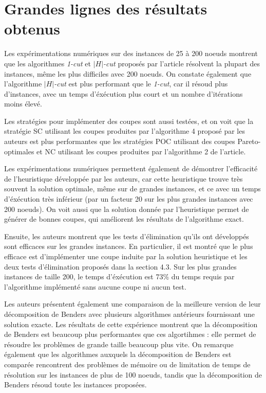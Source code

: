 \section{Grandes lignes des résultats obtenus}

Les expérimentations numériques sur des instances de 25 à 200 noeuds montrent que les algorithmes \emph{1-cut} et \emph{$|H|$-cut} proposés par l'article résolvent la plupart des instances, même les plus difficiles avec 200 noeuds. On constate également que l'algorithme  \emph{$|H|$-cut} est plus performant que le \emph{1-cut}, car il résoud plus d'instances, avec un temps d'éxécution plus court et un nombre d'itérations moins élevé.

Les stratégies pour implémenter des coupes sont aussi testées, et on voit que la stratégie SC utilisant les coupes produites par l'algorithme 4 proposé par les auteurs est plus performantes que les stratégies POC utilisant des coupes Pareto-optimales et NC utilisant les coupes produites par l'algorithme 2 de l'article.

Les expérimentations numériques permettent également de démontrer l'efficacité de l'heuristique développée par les auteurs, car cette heuristique trouve très souvent la solution optimale, même sur de grandes instances, et ce avec un temps d'éxécution très inférieur (par un facteur 20 sur les plus grandes instances avec 200 noeuds). On voit aussi que la solution donnée par l'heuristique permet de générer de bonnes coupes, qui améliorent les résultats de l'algorithme exact. 

Ensuite, les auteurs montrent que les tests d'élimination qu'ils ont développés sont efficaces sur les grandes instances. En particulier, il est montré que le plus efficace est d'implémenter une coupe induite par la solution heuristique et les deux tests d'élimination proposés dans la section 4.3. Sur les plus grandes instances de taille 200, le temps d'éxécution est 73\% du temps requis par l'algorithme implémenté sans aucune coupe ni aucun test. 

Les auteurs présentent également une comparaison de la meilleure version de leur décomposition de Benders avec plusieurs algorithmes antérieurs fournissant une solution exacte. Les résultats de cette expérience montrent que la décomposition de Benders est beaucoup plus performantes que ces algortihmes : elle permet de résoudre les problèmes de grande taille beaucoup plus vite. On remarque également que les algorithmes auxquels la décomposition de Benders est comparée rencontrent des problèmes de mémoire ou de limitation de temps de résolution sur les instances de plus de 100 noeuds, tandis que la décomposition de Benders résoud toute les instances proposées.

